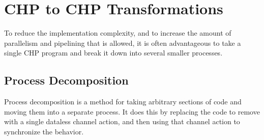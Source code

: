 \documentclass[times,10pt]{article}
\begin{document}




\section{CHP to CHP Transformations}

To reduce the implementation complexity, and to increase the amount of parallelism and pipelining that is allowed, it is often advantageous to take a single CHP program and break it down into several smaller processes.

\subsection{Process Decomposition}

Process decomposition is a method for taking arbitrary sections of code and moving them into a separate process.  It does this by replacing the code to remove with a single dataless channel action, and then using that channel action to synchronize the behavior.
\end{document}
